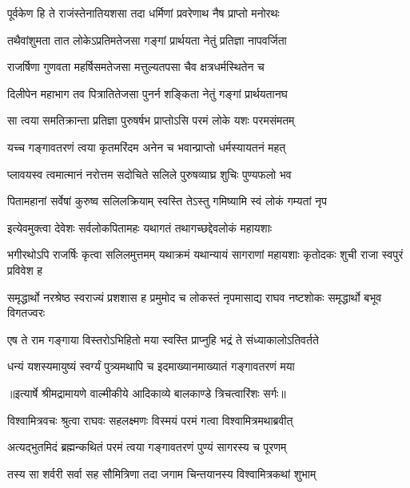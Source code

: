 \twolineshloka
{पूर्वकेण हि ते राजंस्तेनातियशसा तदा}
{धर्मिणां प्रवरेणाथ नैष प्राप्तो मनोरथः} %

\twolineshloka
{तथैवांशुमता तात लोकेऽप्रतिमतेजसा}
{गङ्गां प्रार्थयता नेतुं प्रतिज्ञा नापवर्जिता} %

\twolineshloka
{राजर्षिणा गुणवता महर्षिसमतेजसा}
{मत्तुल्यतपसा चैव क्षत्रधर्मस्थितेन च} %

\twolineshloka
{दिलीपेन महाभाग तव पित्रातितेजसा}
{पुनर्न शङ्किता नेतुं गङ्गां प्रार्थयतानघ} %

\twolineshloka
{सा त्वया समतिक्रान्ता प्रतिज्ञा पुरुषर्षभ}
{प्राप्तोऽसि परमं लोके यशः परमसंमतम्} %

\twolineshloka
{यच्च गङ्गावतरणं त्वया कृतमरिंदम}
{अनेन च भवान्प्राप्तो धर्मस्यायतनं महत्} %

\twolineshloka
{प्लावयस्व त्वमात्मानं नरोत्तम सदोचिते}
{सलिले पुरुषव्याघ्र शुचिः पुण्यफलो भव} %

\twolineshloka
{पितामहानां सर्वेषां कुरुष्व सलिलक्रियाम्}
{स्वस्ति तेऽस्तु गमिष्यामि स्वं लोकं गम्यतां नृप} %

\twolineshloka
{इत्येवमुक्त्वा देवेशः सर्वलोकपितामहः}
{यथागतं तथागच्छद्देवलोकं महायशाः} %

\threelineshloka
{भगीरथोऽपि राजर्षिः कृत्वा सलिलमुत्तमम्}
{यथाक्रमं यथान्यायं सागराणां महायशाः}
{कृतोदकः शुची राजा स्वपुरं प्रविवेश ह} %

\threelineshloka
{समृद्धार्थो नरश्रेष्ठ स्वराज्यं प्रशशास ह}
{प्रमुमोद च लोकस्तं नृपमासाद्य राघव}
{नष्टशोकः समृद्धार्थो बभूव विगतज्वरः} %

\twolineshloka
{एष ते राम गङ्गाया विस्तरोऽभिहितो मया}
{स्वस्ति प्राप्नुहि भद्रं ते संध्याकालोऽतिवर्तते} %

\twolineshloka
{धन्यं यशस्यमायुष्यं स्वर्ग्यं पुत्र्यमथापि च}
{इदमाख्यानमाख्यातं गङ्गावतरणं मया} %


{॥इत्यार्षे श्रीमद्रामायणे वाल्मीकीये आदिकाव्ये बालकाण्डे त्रिचत्वारिंशः सर्गः॥}


\twolineshloka
{विश्वामित्रवचः श्रुत्वा राघवः सहलक्ष्मणः}
{विस्मयं परमं गत्वा विश्वामित्रमथाब्रवीत्} %

\twolineshloka
{अत्यद्भुतमिदं ब्रह्मन्कथितं परमं त्वया}
{गङ्गावतरणं पुण्यं सागरस्य च पूरणम्} %

\twolineshloka
{तस्य सा शर्वरी सर्वा सह सौमित्रिणा तदा}
{जगाम चिन्तयानस्य विश्वामित्रकथां शुभाम्} %

